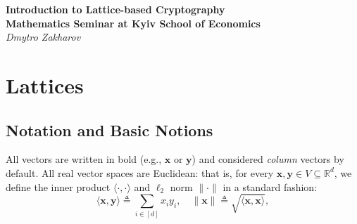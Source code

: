 \documentclass{template}
\begin{document}
\begin{center}
    \Large\textcolor{blue!70!black}{\textbf{Introduction to Lattice-based Cryptography}} \\
    \large \textbf{Mathematics Seminar at Kyiv School of Economics} \\
    \normalsize\textit{Dmytro Zakharov}
\end{center}

\begin{abstract}
    In recent years, the interest in lattice-based cryptography has been
    steadily increasing. One primary reason is, of course, that problems related
    to lattices and their derivatives are widely believed to be \textit{hard
    even for quantum computers}. Furthermore, there are settings where the
    algebraic structure of lattices is natural: e.g., for fully-homomorphic
    encryption.

    This brief seminar is devoted to technical introduction to lattice-based
    cryptography. We give formal definitions of lattices and introduce key
    related hardness assumptions such as SVP, CVP, and LWE. We show how to build
    public-key encryption (PKE) scheme and give an overview of basic ideas of
    modern cryptanalysis.
\end{abstract}

\tableofcontents

\newpage

\section{Lattices}\label{section:lattices}

\subsection*{Notation and Basic Notions}

All vectors are written in bold (e.g., $\mathbf{x}$ or $\mathbf{y}$) and
considered \textit{column} vectors by default. All real vector spaces are
Euclidean: that is, for every $\mathbf{x}, \mathbf{y} \in V \subseteq
\mathbb{R}^d$, we define the inner product $\langle \cdot, \cdot \rangle$ and
$\ell_2$ norm $\|\cdot\|$ in a standard fashion:
\begin{equation*}
    \langle \mathbf{x}, \mathbf{y} \rangle \triangleq \sum_{i \in [d]} x_iy_i, \quad \|\mathbf{x}\| \triangleq \sqrt{\langle \mathbf{x}, \mathbf{x} \rangle},
\end{equation*}
\end{document}
